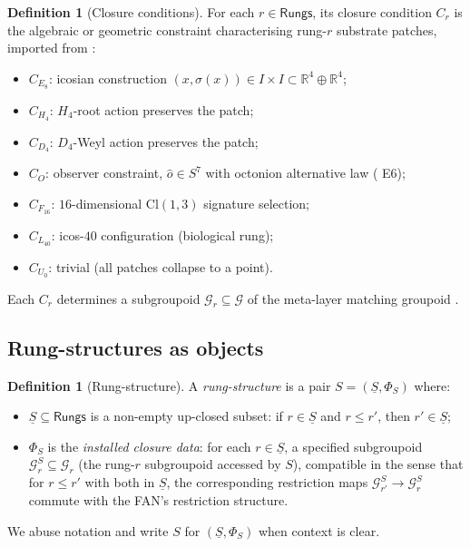 \documentclass[11pt, a4paper]{amsart}
\theoremstyle{definition}
\newtheorem{definition}[theorem]{Definition}
\newcommand{\R}{\mathbb{R}}
\newcommand{\Rungs}{\mathsf{Rungs}}
\newcommand{\Gcal}{\mathcal{G}}
\begin{document}
\begin{definition}[Closure conditions]
\label{def:closure-cond}
For each $r \in \Rungs$, its closure condition $C_r$ is the
algebraic or geometric constraint characterising rung-$r$ substrate
patches, imported from
\cite[Table in \S 1.3]{CascadeObserverQueryAlgebra}:
\begin{itemize}
\item $C_{E_8}$: icosian construction $(x, \sigma(x)) \in I \times I
  \subset \R^4 \oplus \R^4$;
\item $C_{H_4}$: $H_4$-root action preserves the patch;
\item $C_{D_4}$: $D_4$-Weyl action preserves the patch;
\item $C_{O}$: observer constraint, $\hat o \in S^7$ with octonion
  alternative law (\cite{CascadeObserverQueryAlgebra} E6);
\item $C_{F_{16}}$: $16$-dimensional $\mathrm{Cl}(1,3)$ signature
  selection;
\item $C_{L_{40}}$: icos-$40$ configuration (biological rung);
\item $C_{U_0}$: trivial (all patches collapse to a point).
\end{itemize}
Each $C_r$ determines a subgroupoid $\Gcal_r \subseteq \Gcal$ of
the meta-layer matching groupoid
\cite{CascadeMetaLayer}.
\end{definition}

\subsection{Rung-structures as objects}

\begin{definition}[Rung-structure]
\label{def:rung-structure}
A \emph{rung-structure} is a pair $S = (\underline{S},
\Phi_S)$ where:
\begin{itemize}
\item $\underline{S} \subseteq \Rungs$ is a non-empty up-closed
  subset: if $r \in \underline{S}$ and $r \leq r'$, then $r'
  \in \underline{S}$;
\item $\Phi_S$ is the \emph{installed closure data}: for each
  $r \in \underline{S}$, a specified subgroupoid
  $\Gcal_r^S \subseteq \Gcal_r$ (the rung-$r$ subgroupoid
  accessed by $S$), compatible in the sense that for $r \leq r'$
  with both in $\underline{S}$, the corresponding restriction maps
  $\Gcal_{r'}^S \to \Gcal_r^S$ commute with the FAN's restriction
  structure.
\end{itemize}
We abuse notation and write $S$ for $(\underline{S}, \Phi_S)$
when context is clear.
\end{definition}
\end{document}
